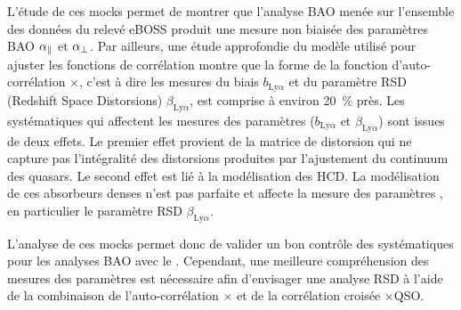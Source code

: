 \begin{mdframed}[linecolor=Prune,linewidth=1]
\begin{small}
\begin{multicols}{2}
  L'étude de ces mocks permet de montrer que l'analyse BAO menée sur l'ensemble des données \lya{} du relevé eBOSS produit une mesure non biaisée des paramètres BAO $\alpha_{\parallel}{}$ et $\alpha_{\perp}{}$.
  Par ailleurs, une étude approfondie du modèle utilisé pour ajuster les fonctions de corrélation montre que la forme de la fonction d'auto-corrélation \lya{}$\times$\lya{}, c'est à dire les mesures du biais $b_{\mathrm{Ly}\alpha}$ et du paramètre RSD (Redshift Space Distorsions) $\beta_{\mathrm{Ly}\alpha}$, est comprise à environ \SI{20}{\percent} près.
  Les systématiques qui affectent les mesures des paramètres \lya{} ($b_{\mathrm{Ly}\alpha}$ et $\beta_{\mathrm{Ly}\alpha}$) sont issues de deux effets.
  Le premier effet provient de la matrice de distorsion qui ne capture pas l'intégralité des distorsions produites par l'ajustement du continuum des quasars.
  Le second effet est lié à la modélisation des HCD.
  La modélisation de ces absorbeurs denses n'est pas parfaite et affecte la mesure des paramètres \lya{}, en particulier le paramètre RSD $\beta_{\mathrm{Ly}\alpha}$.

  L'analyse de ces mocks permet donc de valider un bon contrôle des systématiques pour les analyses BAO avec le \lya{}.
  Cependant, une meilleure compréhension des mesures des paramètres \lya{} est nécessaire afin d'envisager une analyse RSD à l'aide de la combinaison de l'auto-corrélation \lya{}$\times$\lya{} et de la corrélation croisée \lya{}$\times$QSO.
\end{multicols}
\end{small}
\end{mdframed}


